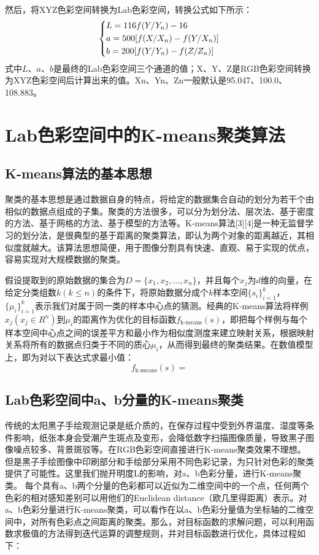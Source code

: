 \documentclass[UTF8,a4paper,twoside]{ctexart}
\begin{document}
然后，将XYZ色彩空间转换为Lab色彩空间，转换公式如下所示：
\begin{equation}
  \left\{
    \begin{lgathered}
      L = 116 f(Y/Y_n) - 16 \\
      a = 500[f(X/X_n) - f(Y/X_n)] \\
      b = 200[f(Y/Y_n) - f(Z/Z_n)]
    \end{lgathered}
  \right.
\end{equation}
式中$L$、$a$、$b$是最终的Lab色彩空间三个通道的值；X、Y、Z是RGB色彩空间转换为XYZ色彩空间后计算出来的值。Xn、Yn、Zn一般默认是95.047、100.0、108.883。

\section{Lab色彩空间中的K-means聚类算法}
\subsection{K-means算法的基本思想}
聚类的基本思想是通过数据自身的特点，将给定的数据集合自动的划分为若干个由相似的数据点组成的子集。聚类的方法很多，可以分为划分法、层次法、基于密度的方法、基于网格的方法、基于模型的方法等。K-means算法[3][4]是一种无监督学习的划分法，是很典型的基于距离的聚类算法，即认为两个对象的距离越近，其相似度就越大。该算法思想简便，用于图像分割具有快速、直观、易于实现的优点，容易实现对大规模数据的聚类。

假设提取到的原始数据的集合为$D = \{x_1, x_2, \ldots, x_n\}$，并且每个$x_j$为$d$维的向量，在给定分类组数$k(k\leq n)$的条件下，将原始数据分成个$k$样本空间$\{s_i\}^k_{i=1}$，$\{\mu_i\}^k_{i=1}$表示我们对属于同一类的样本中心点的猜测。经典的K-means算法将样例$x_j(x_j \in R^n)$到$\mu_i$的距离作为优化的目标函数$f_{\text{k-means}}(s)$，即把每个样例与每个样本空间中心点之间的误差平方和最小作为相似度测度来建立映射关系，根据映射关系将所有的数据点归类于不同的质心$\mu_i$，从而得到最终的聚类结果。在数值模型上，即为对以下表达式求最小值：
\begin{equation}
  f_{\text{k-means}}(s) = 
\end{equation}
\subsection{Lab色彩空间中a、b分量的K-means聚类}
传统的太阳黑子手绘观测记录是纸介质的，在保存过程中受到外界温度、湿度等条件影响，纸张本身会受潮产生斑点及变形，会降低数字扫描图像质量，导致黑子图像噪点较多、背景斑驳等。在RGB色彩空间直接进行K-means聚类效果不理想。但是黑子手绘图像中印刷部分和手绘部分采用不同色彩记录，为只针对色彩的聚类提供了可能性。这里我们抛开明度L的影响，对a、b色彩分量，进行K-means聚类。
每个具有a、b两个分量的色彩都可以近似为二维空间中的一个点，任何两个色彩的相对感知差别可以用他们的Euclidean distance（欧几里得距离）表示。对a、b色彩分量进行K-means聚类，可以看作在以a、b色彩分量值为坐标轴的二维空间中，对所有色彩点之间距离的聚类。那么，对目标函数的求解问题，可以利用函数求极值的方法得到迭代运算的调整规则，并对目标函数进行优化，具体过程如下：
\end{document}
